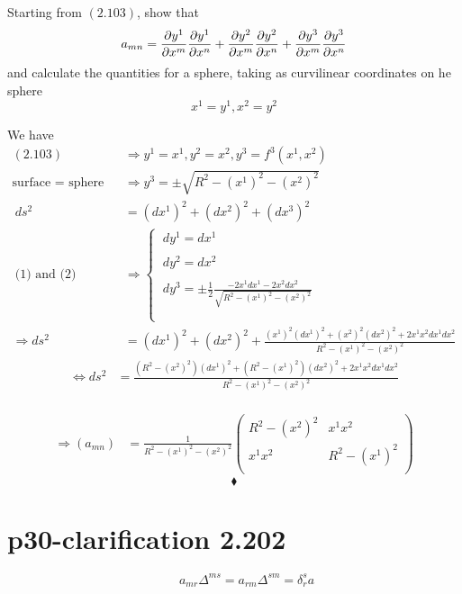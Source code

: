 \begin{tcolorbox}
Starting from $\mathbf{(2.103)}$, show that $$a_{mn} = \pdv{y^1}{x^m}\pdv{y^1}{x^n}+\pdv{y^2}{x^m}\pdv{y^2}{x^n}+\pdv{y^3}{x^m}\pdv{y^3}{x^n}$$ and calculate the quantities for a sphere, taking as curvilinear coordinates on he sphere $$x^1 = y^1 , x^2 = y^2$$
\end{tcolorbox}
We have
\begin{align}
\mathbf{(2.103)}\quad &\Rightarrow y^1 = x^1 , y^2 = x^2, y^3 = f^3(x^1,x^2)\\
\text{surface = sphere}\quad &\Rightarrow y^3 = \pm \sqrt{R^2 -(x^1)^2-(x^2)^2}\\
\ ds^2 &= (dx^1)^2+(dx^2)^2+(dx^3)^2\\
\ \text{(1) and (2)}\quad& \Rightarrow \left\{ \begin{array}{c} 
\ dy^1 = dx^1\\\\
\ dy^2 = dx^2\\\\
\ dy^3 = \pm \frac{1}{2} \frac{-2x^1dx^1 - 2x^2dx^2}{\sqrt{R^2 -(x^1)^2-(x^2)^2}}\\\\
\end{array}
\right.\\
\Rightarrow ds^2 & = (dx^1)^2 +  (dx^2)^2 + \frac{(x^1)^2(dx^1)^2 + (x^2)^2(dx^2)^2  + 2 x^1x^2dx^1dx^2}{R^2 -(x^1)^2-(x^2)^2}
\end{align}
\begin{align}
\Leftrightarrow ds^2 & = \frac{(R^2 - (x^2)^2) (dx^1)^2 + (R^2 -(x^1)^2) (dx^2)^2  + 2 x^1x^2dx^1dx^2}{R^2 -(x^1)^2-(x^2)^2}
\end{align}\\
\begin{align}
\Rightarrow (a_{mn}) &= \frac{1}{R^2 -(x^1)^2-(x^2)^2}\begin{pmatrix}
 R^2 - (x^2)^2&x^1x^2 \\
x^1x^2 & R^2 - (x^1)^2 \\
\end{pmatrix}
\end{align}
$$\blacklozenge$$
\newpage


\section{p30-clarification 2.202}

\begin{tcolorbox}
           $$\quad\quad a_{mr}\Delta^{ms} = a_{rm}\Delta^{sm} = \delta^s_r a$$
\end{tcolorbox}

